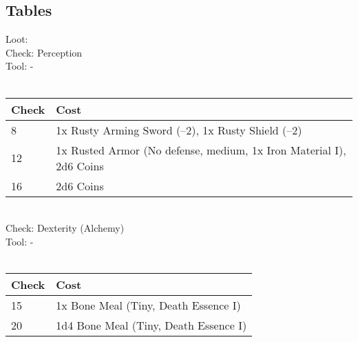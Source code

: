 \subsection{Tables}
Loot:\\
Check: Perception\\
Tool: -\\
\\
\begin{minipage}{0.8\textwidth}
    \begin{tabular}{|l | l|}
        \hline
        Check & Cost\\
        \hline
        8 & 1x Rusty Arming Sword (--2), 1x Rusty Shield (--2)\\
        12 & 1x Rusted Armor (No defense, medium, 1x Iron Material I), 2d6 Coins\\
        16 & 2d6 Coins\\
        \hline
    \end{tabular}
\end{minipage}
\\
Check: Dexterity (Alchemy)\\
Tool: -\\
\\
\begin{minipage}{0.8\textwidth}
    \begin{tabular}{|l | l|}
        \hline
        Check & Cost\\
        \hline
        15 & 1x Bone Meal (Tiny, Death Essence I)\\
        20 & 1d4 Bone Meal (Tiny, Death Essence I)\\
        \hline
    \end{tabular}
\end{minipage}
\pagebreak